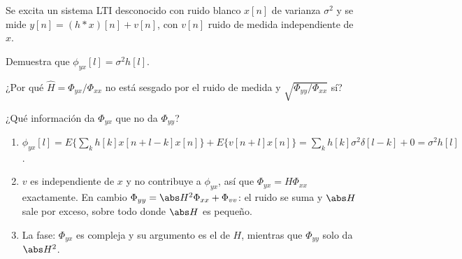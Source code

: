 \documentclass[11pt,a4paper]{scrartcl}
\begin{document}
\begin{ejercicio}
  Se excita un sistema LTI desconocido con ruido blanco $x[n]$ de varianza $\sigma^2$ y se mide $y[n]=(h*x)[n]+v[n]$, con $v[n]$ ruido de medida independiente de $x$.
  \begin{incisos}[1]
    \item Demuestra que $\phi_{yx}[l]=\sigma^2h[l]$.
    \item ¿Por qué $\hat H=\Phi_{yx}/\Phi_{xx}$ no está sesgado por el ruido de medida y $\sqrt{\Phi_{yy}/\Phi_{xx}}$ sí?
    \item ¿Qué información da $\Phi_{yx}$ que no da $\Phi_{yy}$?
  \end{incisos}
\end{ejercicio}
\begin{solucion}
  \begin{enumerate}[label=\alph*)]
    \item $\phi_{yx}[l]=E\{\sum_kh[k]x[n+l-k]x[n]\}+E\{v[n+l]x[n]\}=\sum_kh[k]\sigma^2\delta[l-k]+0=\sigma^2h[l]$.
    \item $v$ es independiente de $x$ y no contribuye a $\phi_{yx}$, así que $\Phi_{yx}=H\Phi_{xx}$ exactamente. En cambio $\Phi_{yy}=\abs H^2\Phi_{xx}+\Phi_{vv}$: el ruido se suma y $\abs H$ sale por exceso, sobre todo donde $\abs H$ es pequeño.
    \item La fase: $\Phi_{yx}$ es compleja y su argumento es el de $H$, mientras que $\Phi_{yy}$ solo da $\abs H^2$.
  \end{enumerate}
\end{solucion}
\end{document}
